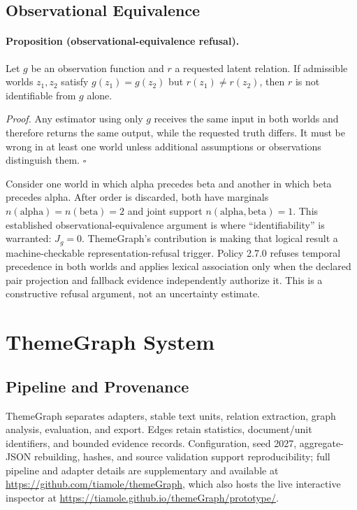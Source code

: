 \documentclass[manuscript,screen,review]{acmart}
\begin{document}
\subsection{Observational Equivalence}

\paragraph{Proposition (observational-equivalence refusal).} Let $g$ be an observation function and $r$ a requested latent relation. If admissible worlds $z_1,z_2$ satisfy $g(z_1)=g(z_2)$ but $r(z_1)\neq r(z_2)$, then $r$ is not identifiable from $g$ alone.

\emph{Proof.} Any estimator using only $g$ receives the same input in both worlds and therefore returns the same output, while the requested truth differs. It must be wrong in at least one world unless additional assumptions or observations distinguish them. \hfill$\square$

Consider one world in which alpha precedes beta and another in which beta precedes alpha. After order is discarded, both have marginals $n(\mathrm{alpha})=n(\mathrm{beta})=2$ and joint support $n(\mathrm{alpha},\mathrm{beta})=1$. This established observational-equivalence argument is where ``identifiability'' is warranted: $J_g=0$. ThemeGraph's contribution is making that logical result a machine-checkable representation-refusal trigger. Policy 2.7.0 refuses temporal precedence in both worlds and applies lexical association only when the declared pair projection and fallback evidence independently authorize it. This is a constructive refusal argument, not an uncertainty estimate.

\section{ThemeGraph System}

\subsection{Pipeline and Provenance}

ThemeGraph separates adapters, stable text units, relation extraction, graph analysis, evaluation, and export. Edges retain statistics, document/unit identifiers, and bounded evidence records. Configuration, seed 2027, aggregate-JSON rebuilding, hashes, and source validation support reproducibility; full pipeline and adapter details are supplementary and available at \url{https://github.com/tiamole/themeGraph}, which also hosts the live interactive inspector at \url{https://tiamole.github.io/themeGraph/prototype/}.
\end{document}
